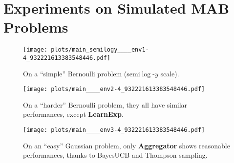 \documentclass[conference]{IEEEtran}
\theoremstyle{plain}  %
\newcommand{\Aggr}[0]{\textbf{Aggregator}}
\newcommand{\LearnExp}[0]{\textbf{LearnExp}}
\begin{document}
\section{Experiments on Simulated MAB Problems}\label{sec:numExp}

\begin{figure*}[h!]  %
	\centering
	\texttt{[image: plots/main\_semilogy\_\_\_\_env1-4\_932221613383548446.pdf]}
	\caption{\small On a ``simple'' Bernoulli problem (semi$\log$-$y$ scale).}
	\label{fig:EasyBernoulli}
\end{figure*}

\begin{figure}[b!]  %
	\centering
	\texttt{[image: plots/main\_\_\_\_env2-4\_932221613383548446.pdf]}
	\caption{\small On a ``harder'' Bernoulli problem, they all have similar performances, except \LearnExp.}
	\label{fig:HardBernoulli}
\end{figure}
%
\begin{figure}[b!]  %
	\centering
	\texttt{[image: plots/main\_\_\_\_env3-4\_932221613383548446.pdf]}
	\caption{\small On an ``easy'' Gaussian problem, only \Aggr{} shows reasonable performances, thanks to BayesUCB and Thompson sampling.}
	\label{fig:EasyGaussian}
\end{figure}
\end{document}
